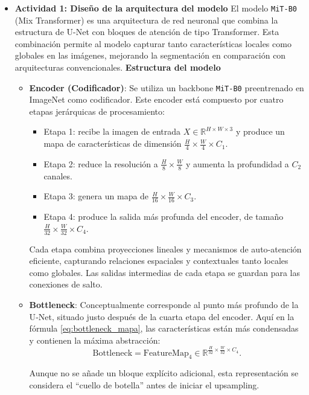 \begin{enumerate}
\begin{itemize}
  \item\textbf{Actividad 1: Diseño de la arquitectura del modelo}
  El modelo \texttt{MiT-B0} (Mix Transformer) es una arquitectura de red neuronal que combina la estructura de U-Net con bloques de atención de tipo Transformer. Esta combinación permite al modelo capturar tanto características locales como globales en las imágenes, mejorando la segmentación en comparación con arquitecturas convencionales.
\textbf{Estructura del modelo}
\begin{itemize}
  \item \textbf{Encoder (Codificador)}:  
    Se utiliza un backbone \texttt{MiT-B0} preentrenado en ImageNet como codificador. Este encoder está compuesto por cuatro etapas jerárquicas de procesamiento:
    \begin{itemize}
      \item Etapa 1: recibe la imagen de entrada $X\in\mathbb{R}^{H\times W\times3}$ y produce un mapa de características de dimensión $\frac{H}{4}\times\frac{W}{4}\times C_1$.
      \item Etapa 2: reduce la resolución a $\frac{H}{8}\times\frac{W}{8}$ y aumenta la profundidad a $C_2$ canales.
      \item Etapa 3: genera un mapa de $\frac{H}{16}\times\frac{W}{16}\times C_3$.
      \item Etapa 4: produce la salida más profunda del encoder, de tamaño $\frac{H}{32}\times\frac{W}{32}\times C_4$.
    \end{itemize}
    Cada etapa combina proyecciones lineales y mecanismos de auto‑atención eficiente, capturando relaciones espaciales y contextuales tanto locales como globales. Las salidas intermedias de cada etapa se guardan para las conexiones de salto.

  \item \textbf{Bottleneck}:  
    Conceptualmente corresponde al punto más profundo de la U‑Net, situado justo después de la cuarta etapa del encoder. Aquí en la fórmula \ref{eq:bottleneck_mapa}, las características están más condensadas y contienen la máxima abstracción:
    \begin{equation}\label{eq:bottleneck_mapa}
      \text{Bottleneck} = \text{FeatureMap}_{4} \in \mathbb{R}^{\frac{H}{32}\times\frac{W}{32}\times C_4}.
  \end{equation}

    Aunque no se añade un bloque explícito adicional, esta representación se considera el “cuello de botella” antes de iniciar el upsampling.


\end{itemize}
\end{itemize}
\end{enumerate}
